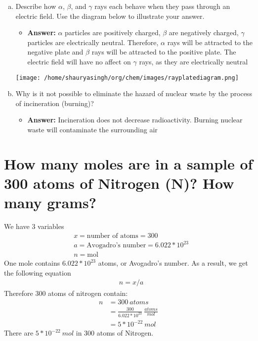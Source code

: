 \documentclass{scrartcl}
\begin{document}
\begin{enumerate}[(a)]
\item Describe how \(\alpha\), \(\beta\), and \(\gamma\) rays each behave when they pass through an
electric field. Use the diagram below to illustrate your answer.
\begin{itemize}
\item \textbf{Answer:} \(\alpha\) particles are positively charged, \(\beta\) are negatively charged,
\(\gamma\) particles are electrically neutral. Therefore, \(\alpha\) rays will be
attracted to the negative plate and \(\beta\) rays will be attracted to
the positive plate. The electric field will have no affect on \(\gamma\)
rays, as they are electrically neutral
\end{itemize}
\begin{center}
\texttt{[image: /home/shauryasingh/org/chem/images/rayplatediagram.png]}
\end{center}

\item Why is it not possible to eliminate the hazard of nuclear waste by the
process of incineration (burning)?
\begin{itemize}
\item \textbf{Answer:} Incineration does not decrease radioactivity. Burning nuclear
waste will contaminate the surrounding air
\end{itemize}
\end{enumerate}

\section{How many moles are in a sample of 300 atoms of Nitrogen (N)? How many grams?}
\label{sec:orgd87494c}
We have 3 variables
\begin{align*}
&x=\text{number of atoms}=300\\
&a=\text{Avogadro's number}=6.022*10^{23}\\
&n=\text{mol}
\end{align*}
One mole contains \(6.022 *10^{23}\) atoms, or Avogadro's number. As a result, we
get the following equation
\begin{align*}
&n=x/a
\end{align*}
Therefore 300 atoms of nitrogen contain:
\begin{align*}
n&=300\ atoms\\
&=\frac{300}{6.022*10^{23}}\ \frac{atoms}{mol}\\
&=5*10^{-22}\ mol
\end{align*}
There are \(5*10^{-22}\ mol\) in 300 atoms of Nitrogen.
\end{document}
